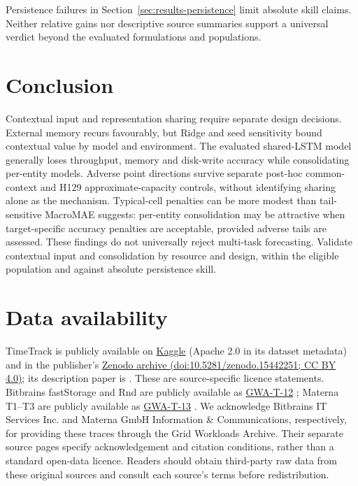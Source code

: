 \documentclass[a4paper,fleqn]{cas-dc}
\begin{document}
Persistence failures in Section~\ref{sec:results-persistence} limit absolute
skill claims. Neither relative gains nor descriptive source summaries support
a universal verdict beyond the evaluated formulations and populations.

\section{Conclusion}
\label{sec:conclusion}

Contextual input and representation sharing require separate design decisions.
External memory recurs favourably, but Ridge and seed sensitivity bound
contextual value by model and environment. The evaluated shared-LSTM model
generally loses throughput, memory and disk-write accuracy while consolidating
per-entity models. Adverse point directions survive separate post-hoc common-context
and H129 approximate-capacity controls, without identifying sharing alone as
the mechanism. Typical-cell penalties can be more modest than tail-sensitive
MacroMAE suggests: per-entity consolidation may be attractive when
target-specific accuracy penalties are acceptable, provided adverse tails
are assessed. These findings do not universally reject multi-task forecasting.
Validate contextual input and consolidation by resource and design, within
the eligible population and against absolute persistence skill.

\section*{Data availability}

TimeTrack is publicly available on
\href{https://www.kaggle.com/datasets/abdelghanimeliani/open-air-interface-cicd-timeseries-dataset}{Kaggle}
(Apache 2.0 in its dataset metadata) and in the publisher's
\href{https://doi.org/10.5281/zenodo.15442251}{Zenodo archive
(doi:10.5281/zenodo.15442251; CC BY 4.0)}; its description paper is
\citet{Meliani2025TimeTrack}. These are source-specific licence statements.
Bitbrains fastStorage and Rnd are publicly available as
\href{https://atlarge-research.com/gwa-t-12/}{GWA-T-12}
\citep{Shen2015Bitbrains}; Materna T1--T3 are publicly available as
\href{https://atlarge-research.com/gwa-t-13/}{GWA-T-13}
\citep{Kohne2014FederatedCloudSim,Kohne2016SLAScheduling}.
We acknowledge Bitbrains IT Services Inc. and Materna GmbH Information
\& Communications, respectively, for providing these traces through the
Grid Workloads Archive. Their separate source pages specify acknowledgement
and citation conditions, rather than a standard open-data licence. Readers
should obtain third-party raw data from these original sources and consult
each source's terms before redistribution.
\end{document}
